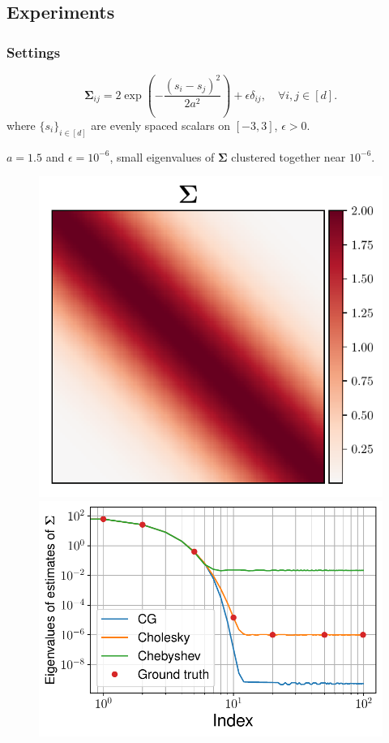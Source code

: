 \documentclass[aspectratio=169]{beamer}
\newcommand{\B}[1]{\mathbf{#1}} %
\newcommand{\pr}[1]{\left(#1\right)} %
\begin{document}
\subsection{Experiments}
\begin{frame}
\frametitle{Settings}
\[
    \B{\Sigma}_{ij} = 2 \exp\pr{-\dfrac{(s_i-s_j)^2}{2a^2}} + \epsilon\delta_{ij}, \quad \forall i,j \in [d]. 
\]
where $\{s_{i}\}_{i\in[d]}$ are evenly spaced scalars on $[-3,3]$, $\epsilon > 0$.

$a = 1.5$ and $\epsilon = 10^{-6}$, small eigenvalues of $\B{\Sigma}$ clustered together near $10^{-6}$.

\begin{figure}
\centering
\mbox{{\includegraphics[scale=0.45]{src/images/simu1_ex1_A.pdf}}}
\mbox{{\includegraphics[scale=0.4]{src/images/simu1_ex1_eigvals.pdf}}}
\end{figure}
\end{frame}
\end{document}
